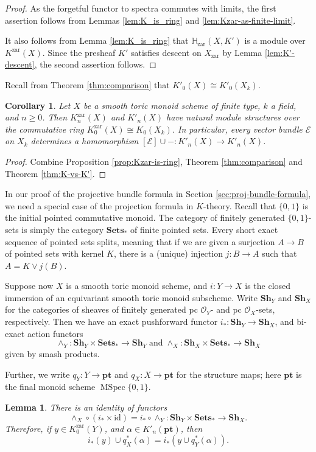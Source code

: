 \documentclass[12pt]{amsart}
\def\zar{{\mathrm{zar}}}
\def\Kzar{K^{\mathrm{zar}}}
\def\Sh{\mathbf{Sh}}
\newcommand{\bbH}{\mathbb H}
\newcommand{\pt}{\mathbf{pt}}
\def\MSpec{\operatorname{MSpec}}
\numberwithin{equation}{section}
\theoremstyle{plain}
\newtheorem{lem}[equation]{Lemma}
\newtheorem{cor}[equation]{Corollary}
\theoremstyle{definition}
\theoremstyle{remark}
\begin{document}
\begin{proof}
  As the forgetful functor to spectra commutes with limits,
  the first assertion follows from Lemmas \ref{lem:K_is_ring}
  and \ref{lem:Kzar-as-finite-limit}.

  It also follows from Lemma \ref{lem:K_is_ring} that
  $\bbH_\zar(X,K')$ is a module over $\Kzar(X)$. Since the
  presheaf $K'$ satisfies descent on $X_\zar$ by Lemma \ref{lem:K'-descent}, the second assertion follows. 
\end{proof}

Recall from Theorem \ref{thm:comparison} that $K'_0(X)\cong K'_0(X_k)$.

\begin{cor}\label{cor:vb-action}
  Let $X$ be a smooth toric monoid scheme of finite type, $k$ a field,
  and $n\geq 0$. Then $\Kzar_n(X)$ and $K'_n(X)$ have natural
  module structures over the commutative ring $\Kzar_0(X)\cong K_0(X_k)$.
  In particular, every vector bundle $\mathcal{E}$ on $X_k$
  determines a homomorphism $[\mathcal{E}]\cup - : K'_n(X) \to K'_n(X)$.
\end{cor}

\begin{proof}
	Combine Proposition \ref{prop:Kzar-is-ring}, Theorem \ref{thm:comparison} and Theorem \ref{thm:K-vs-K'}.\end{proof}

In our proof of the projective bundle formula in Section
\ref{sec:proj-bundle-formula}, we need a special case of the
projection formula in $K$-theory. Recall that $\{0,1\}$ is the initial
pointed commutative monoid. The category of finitely generated
$\{0,1\}$-sets is simply the category $\mathbf{Sets}_*$ of finite
pointed sets. Every short exact sequence of pointed sets splits,
meaning that if we are given a surjection $A\to B$ of pointed sets with kernel
$K$, there is a (unique) injection $j:B\to A$ such that $A = K\vee j(B)$.

Suppose now $X$ is a smooth toric monoid scheme, and $i:Y\to X$ is the
closed immersion of an equivariant smooth toric monoid
subscheme. Write $\Sh_Y$ and $\Sh_X$ for the categories of sheaves of
finitely generated pc $\mathcal{O}_Y$- and pc $\mathcal{O}_X$-sets,
respectively. Then we have
an exact pushforward functor $i_*:\Sh_Y\to \Sh_X$, and bi-exact action
functors \[\wedge_Y: \Sh_Y\times \mathbf{Sets}_*\to
\Sh_Y\;\mathrm{and}\;\wedge_X:\Sh_X\times \mathbf{Sets}_*\to \Sh_X\]
given by smash products.

Further, we write $q_Y:Y\to \pt$ and $q_X:X\to \pt$ for the structure
maps; here $\pt$ is the final monoid scheme $\MSpec\{0,1\}$.
\begin{lem}\label{lem:projection_formula_1}
	There is an identity of functors 
	\[\wedge_X\circ (i_*\times\mathrm{id}) = i_* \circ \wedge_Y:  \Sh_Y\times\mathbf{Sets}_*\to \Sh_X.\]
	 Therefore, if $y\in \Kzar_0 (Y)$, and $\alpha\in K'_n(\pt)$, then
	\[ i_*(y)\cup q_X^*(\alpha)=i_*(y\cup q_Y^*(\alpha)).\]
\end{lem}
\end{document}
